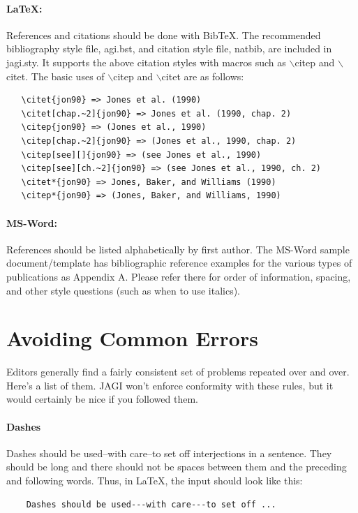 \documentclass[twoside,11pt]{article}
\begin{document}
\paragraph{\LaTeX{}:} References and citations should be done with BibTeX.  The recommended bibliography style file, agi.bst, and citation style file, natbib, are included in jagi.sty. It supports the above citation styles with macros such as $\backslash$citep{} and $\backslash$citet{}. The basic uses of $\backslash$citep{} and $\backslash$citet{} are as follows: 
\begin{verbatim}   \citet{jon90} => Jones et al. (1990) 
   \citet[chap.~2]{jon90} => Jones et al. (1990, chap. 2) 
   \citep{jon90} => (Jones et al., 1990) 
   \citep[chap.~2]{jon90} => (Jones et al., 1990, chap. 2) 
   \citep[see][]{jon90} => (see Jones et al., 1990) 
   \citep[see][ch.~2]{jon90} => (see Jones et al., 1990, ch. 2) 
   \citet*{jon90} => Jones, Baker, and Williams (1990) 
   \citep*{jon90} => (Jones, Baker, and Williams, 1990) 
\end{verbatim}

\paragraph{MS-Word:}  References should be listed alphabetically by first author.  The MS-Word sample document/template has bibliographic reference examples for the various types of publications as Appendix A. Please refer there for order of information, spacing, and other style questions (such as when to use italics).

\section{Avoiding Common Errors}
Editors generally find a fairly consistent set of problems repeated over and over. Here's a list of them. JAGI won't enforce conformity with these rules, but it would certainly be nice if you followed them. 

\paragraph{Dashes}
Dashes should be used--with care--to set off interjections in a sentence. They should be long and there should not be spaces between them and the preceding and following words. Thus, in \LaTeX{}, the input should look like this: 
\begin{verbatim}
    Dashes should be used---with care---to set off ...
\end{verbatim}
\end{document}
